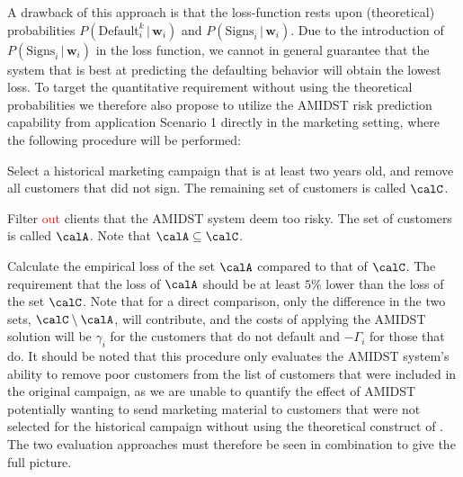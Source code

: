 \documentclass{article}
\theoremstyle{theorem}
\theoremstyle{definition}
\newcommand{\w}{\mathbf{w}}
\begin{document}
\begin{description}
A drawback of this approach is that the loss-function rests upon (theoretical) probabilities $P(\mbox{Default}_i^k \,|\, \w_i)$ and $P(\mbox{Signs}_i \,|\, \w_i)$. Due to the introduction of $P(\mbox{Signs}_i \,|\, \w_i)$ in the loss function, we cannot in general guarantee that the system that is best at predicting the defaulting behavior will obtain the lowest loss. 
To target the quantitative requirement without using the theoretical probabilities we therefore also propose to utilize the AMIDST risk prediction capability from application Scenario 1 directly in the marketing setting, where the following procedure will be performed:
\bit
\item Select a historical marketing campaign that is at least two years old, and remove all customers that did not sign. The remaining set of customers is called $\calC$.
\item  Filter \textcolor{red}{out} clients that the AMIDST system deem too risky. The set of customers is called $\calA$. Note that $\calA\subseteq\calC$.
\item Calculate the empirical loss of the set $\calA$ compared to that of $\calC$. The requirement that the loss of $\calA$ should be at least $5\%$ lower than the loss of the set $\calC$. Note that for a direct comparison, only the difference in the two sets,  $\calC\setminus\calA$, will contribute, and the costs of applying the AMIDST solution will be $\gamma_i$ for the customers that do not default and $-\Gamma_i$ for those that do. 
\eit
It should be noted that this procedure only evaluates the AMIDST system's ability to remove poor customers from the list of customers that were included in the original campaign, as we are unable to quantify the effect of AMIDST potentially wanting to send marketing material to customers that were not selected for the historical campaign without using the theoretical construct of .  The two evaluation approaches must therefore be seen in combination to give the full picture.

\end{description}
\end{document}
